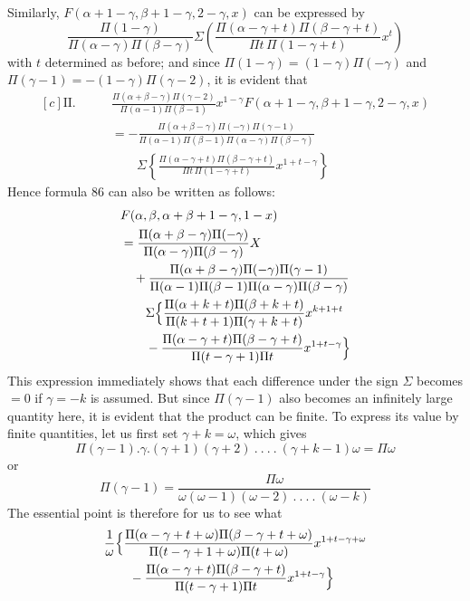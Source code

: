 Similarly, $F(\alpha+1-\gamma,\beta+1-\gamma,2-\gamma,x)$ can be expressed by
\[
\frac{\Pi(1-\gamma)}{\Pi(\alpha-\gamma)\Pi(\beta-\gamma)}
\Sigma\left(\frac{\Pi(\alpha-\gamma+t)\Pi(\beta-\gamma+t)}{\Pi t\,\Pi(1-\gamma+t)}x^t\right)
\]
with $t$ determined as before; and since $\Pi(1-\gamma)=(1-\gamma)\Pi(-\gamma)$ and $\Pi(\gamma-1)=-(1-\gamma)\Pi(\gamma-2)$, it is evident that
\[
\begin{aligned}[c]
\mathrm{II.}\qquad&\frac{\Pi(\alpha+\beta-\gamma)\Pi(\gamma-2)}{\Pi(\alpha-1)\Pi(\beta-1)}x^{1-\gamma}F(\alpha+1-\gamma,\beta+1-\gamma,2-\gamma,x)\\
&=-\frac{\Pi(\alpha+\beta-\gamma)\Pi(-\gamma)\Pi(\gamma-1)}{\Pi(\alpha-1)\Pi(\beta-1)\Pi(\alpha-\gamma)\Pi(\beta-\gamma)}
\\&\qquad\Sigma\left\{\frac{\Pi(\alpha-\gamma+t)\Pi(\beta-\gamma+t)}{\Pi t\,\Pi(1-\gamma+t)}x^{1+t-\gamma}\right\}
\end{aligned}
\]
Hence formula 86 can also be written as follows:
\[
\begin{aligned}[c]
&F(\alpha,\beta,\alpha+\beta+1-\gamma,1-x)\\
&=\frac{\Pi(\alpha+\beta-\gamma)\Pi(-\gamma)}{\Pi(\alpha-\gamma)\Pi(\beta-\gamma)}X\\
&\quad+\frac{\Pi(\alpha+\beta-\gamma)\Pi(-\gamma)\Pi(\gamma-1)}{\Pi(\alpha-1)\Pi(\beta-1)\Pi(\alpha-\gamma)\Pi(\beta-\gamma)}
\\&\qquad\Sigma\Bigl\{\frac{\Pi(\alpha+k+t)\Pi(\beta+k+t)}{\Pi(k+t+1)\Pi(\gamma+k+t)}x^{k+1+t}
\\&\qquad-\frac{\Pi(\alpha-\gamma+t)\Pi(\beta-\gamma+t)}{\Pi(t-\gamma+1)\Pi t}x^{1+t-\gamma}\Bigr\}
\end{aligned}
\]
This expression immediately shows that each difference under the sign $\Sigma$ becomes $=0$ if $\gamma=-k$ is assumed. But since $\Pi(\gamma-1)$ also becomes an infinitely large quantity here, it is evident that the product can be finite. To express its value by finite quantities, let us first set $\gamma+k=\omega$, which gives
\[
\Pi(\gamma-1).\gamma.(\gamma+1)(\gamma+2)\ .\ .\ .\ .\ (\gamma+k-1)\omega=\Pi\omega
\]
or
\[
\Pi(\gamma-1)=\frac{\Pi\omega}{\omega(\omega-1)(\omega-2)\ .\ .\ .\ .\ (\omega-k)}
\]
The essential point is therefore for us to see what
\[
\begin{aligned}&\frac{1}{\omega}\Bigl\{\frac{\Pi(\alpha-\gamma+t+\omega)\Pi(\beta-\gamma+t+\omega)}{\Pi(t-\gamma+1+\omega)\Pi(t+\omega)}x^{1+t-\gamma+\omega}\\&\qquad-\frac{\Pi(\alpha-\gamma+t)\Pi(\beta-\gamma+t)}{\Pi(t-\gamma+1)\Pi t}x^{1+t-\gamma}\Bigr\}\end{aligned}
\]
